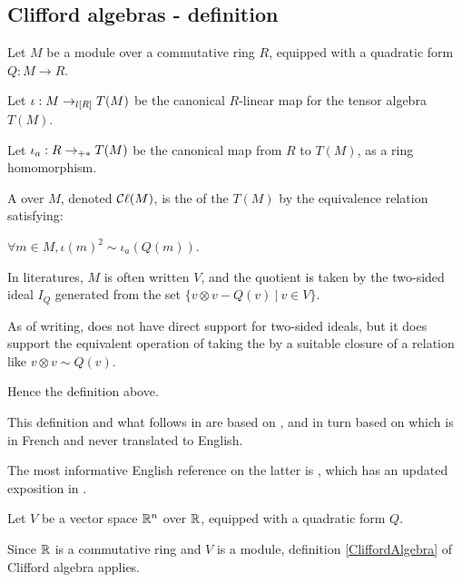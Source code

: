\subsection{Clifford algebras - definition}
\label{sec:def}

\begin{definition}
    \label{CliffordAlgebra}
    \leanok

    Let $M$ be a module over a commutative ring $R$, equipped with a quadratic form $Q: M \to R$.

    Let $\iota : M \lmap{R} T(M)$ be the canonical $R$-linear map for the tensor algebra $T(M)$.

    Let $\iota_a : R \amap{R} T(M)$ be the canonical map from $R$ to $T(M)$, as a ring homomorphism.

    A  over $M$, denoted $\Cl (M)$, is
    the  of the  $T(M)$
    by the equivalence relation satisfying:

    $\forall m \in M, \iota(m)^2 \sim \iota_a(Q(m))$.
\end{definition}

\begin{remark}
  \label{mk:two_sided_ideals}
  
  In literatures, $M$ is often written $V$, and the quotient is taken by the two-sided ideal $I_Q$ generated from the set
  $\{ v \otimes v - Q(v) \:\vert\: v \in V \}$.

  As of writing, \Mathlib does not have direct support for two-sided ideals,
  but it does support the equivalent operation of taking the  by a suitable closure of
  a relation like $v \otimes v \sim Q(v)$.

  Hence the definition above.

\end{remark}

\begin{remark}
  \label{mk:CliffordAlgebra}
  
  This definition and what follows in \Mathlib are based on \cite{grinberg2016clifford},
  and in turn based on \cite{bourbaki2007} which is in French and never translated to English.

  The most informative English reference on the latter is \cite{jadczyk2019notes}, 
  which has an updated exposition in \cite{jadczyk2023bundle}.
\end{remark}

\begin{example}
  \label{ex:clifford_algebra_v}

  Let $V$ be a vector space $\RR^n$ over $\RR$, equipped with a quadratic form $Q$.
  
  Since $\RR$ is a commutative ring and $V$ is a module,
  definition \ref{CliffordAlgebra} of Clifford algebra applies.
\end{example}
